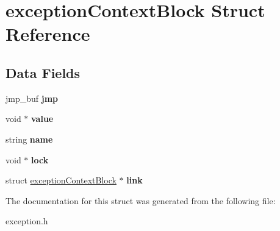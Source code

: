 \hypertarget{structexception_context_block}{}\section{exception\+Context\+Block Struct Reference}
\label{structexception_context_block}
\subsection*{Data Fields}
\begin{DoxyCompactItemize}
\item 
\hypertarget{structexception_context_block_ab8ebbfeb517fea7812af441dc3718d02}{}\label{structexception_context_block_ab8ebbfeb517fea7812af441dc3718d02} 
jmp\+\_\+buf {\bfseries jmp}
\item 
\hypertarget{structexception_context_block_a0f61d63b009d0880a89c843bd50d8d76}{}\label{structexception_context_block_a0f61d63b009d0880a89c843bd50d8d76} 
void $\ast$ {\bfseries value}
\item 
\hypertarget{structexception_context_block_a8ccf841cb59e451791bcb2e1ac4f1edc}{}\label{structexception_context_block_a8ccf841cb59e451791bcb2e1ac4f1edc} 
string {\bfseries name}
\item 
\hypertarget{structexception_context_block_a100fdaedb8eb0d56fd262e7ea2930930}{}\label{structexception_context_block_a100fdaedb8eb0d56fd262e7ea2930930} 
void $\ast$ {\bfseries lock}
\item 
\hypertarget{structexception_context_block_a12371a759ed12826e5f12ca72e7f1e77}{}\label{structexception_context_block_a12371a759ed12826e5f12ca72e7f1e77} 
struct \hyperlink{structexception_context_block}{exception\+Context\+Block} $\ast$ {\bfseries link}
\end{DoxyCompactItemize}


The documentation for this struct was generated from the following file\+:\begin{DoxyCompactItemize}
\item 
exception.\+h\end{DoxyCompactItemize}

